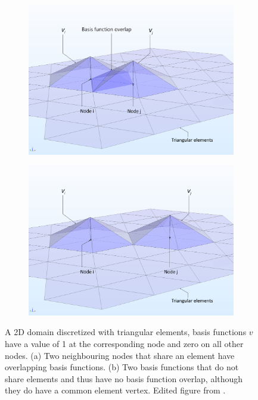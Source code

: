\begin{figure}[htb!]
    \begin{subfigure}{0.5\textwidth}
        \centering
        \includegraphics[width=\linewidth]{figures/Ch2/base-functions-overlap_fixed.png}
        \caption{}
        \label{fig:FEM_2Ddomain_overlap}
    \end{subfigure}
    \begin{subfigure}{0.5\textwidth}
        \centering
        \includegraphics[width=\linewidth]{figures/Ch2/base-functions-no-overlap_fixed.png}
        \caption{}
        \label{fig:FEM_2Ddomain_nooverlap}
    \end{subfigure}
    \caption{A 2D domain discretized with triangular elements, basis functions $v$ have a value of 1 at the corresponding node and zero on all other nodes. (a) Two neighbouring nodes that share an element have overlapping basis functions. (b) Two basis functions that do not share elements and thus have no basis function overlap, although they do have a common element vertex. Edited figure from \cite{FEM_comsol}.}
    \label{fig:FEM_2Ddomain}
\end{figure}


